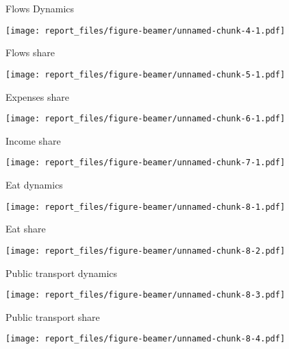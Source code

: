 \documentclass[ignorenonframetext,]{beamer}
\begin{document}
\begin{frame}{Flows Dynamics}
\protect\hypertarget{flows-dynamics}{}

\texttt{[image: report\_files/figure-beamer/unnamed-chunk-4-1.pdf]}

\end{frame}

\begin{frame}{Flows share}
\protect\hypertarget{flows-share}{}

\texttt{[image: report\_files/figure-beamer/unnamed-chunk-5-1.pdf]}

\end{frame}

\begin{frame}{Expenses share}
\protect\hypertarget{expenses-share}{}

\texttt{[image: report\_files/figure-beamer/unnamed-chunk-6-1.pdf]}

\end{frame}

\begin{frame}{Income share}
\protect\hypertarget{income-share}{}

\texttt{[image: report\_files/figure-beamer/unnamed-chunk-7-1.pdf]}

\end{frame}

\begin{frame}{Eat dynamics}
\protect\hypertarget{eat-dynamics}{}

\texttt{[image: report\_files/figure-beamer/unnamed-chunk-8-1.pdf]}

\end{frame}

\begin{frame}{Eat share}
\protect\hypertarget{eat-share}{}

\texttt{[image: report\_files/figure-beamer/unnamed-chunk-8-2.pdf]}

\end{frame}

\begin{frame}{Public transport dynamics}
\protect\hypertarget{public-transport-dynamics}{}

\texttt{[image: report\_files/figure-beamer/unnamed-chunk-8-3.pdf]}

\end{frame}

\begin{frame}{Public transport share}
\protect\hypertarget{public-transport-share}{}

\texttt{[image: report\_files/figure-beamer/unnamed-chunk-8-4.pdf]}

\end{frame}
\end{document}
